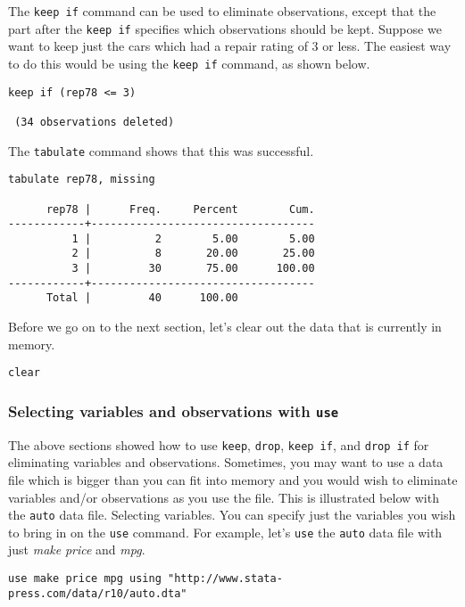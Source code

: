 The \lstinline{keep if} command can be used to eliminate observations, except that the part after the \lstinline{keep if} specifies which observations should be kept. Suppose we want to keep just the cars which had a repair rating of 3 or less. The easiest way to do this would be using the \lstinline{keep if} command, as shown below.

\begin{lstlisting}
keep if (rep78 <= 3)

 (34 observations deleted)
\end{lstlisting}

The \lstinline{tabulate} command shows that this was successful.

\begin{lstlisting}
tabulate rep78, missing

      rep78 |      Freq.     Percent        Cum.
------------+-----------------------------------
          1 |          2        5.00        5.00
          2 |          8       20.00       25.00
          3 |         30       75.00      100.00
------------+-----------------------------------
      Total |         40      100.00
\end{lstlisting}

Before we go on to the next section, let's clear out the data that is currently in memory.

\begin{lstlisting}
clear
\end{lstlisting}

\subsubsection{Selecting variables and observations with \lstinline{use}}

The above sections showed how to use \lstinline{keep}, \lstinline{drop}, \lstinline{keep if}, and \lstinline{drop if} for eliminating variables and observations. Sometimes, you may want to use a data file which is bigger than you can fit into memory and you would wish to eliminate variables and/or observations as you use the file. This is illustrated below with the \lstinline{auto} data file. Selecting variables. You can specify just the variables you wish to bring in on the \lstinline{use} command. For example, let's \lstinline{use} the \lstinline{auto} data file with just \textit{make} \textit{price} and \textit{mpg}.

\begin{lstlisting}
use make price mpg using "http://www.stata-press.com/data/r10/auto.dta"
\end{lstlisting}

